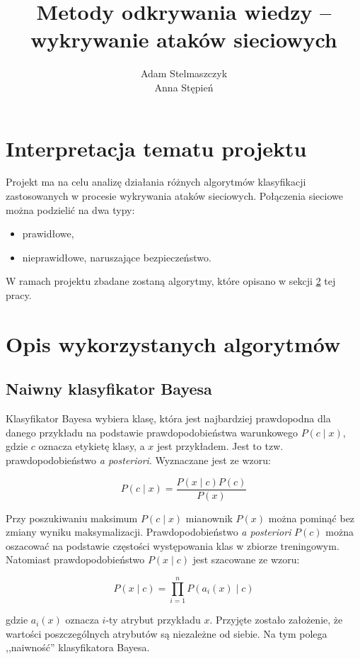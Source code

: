 \documentclass[a4paper, 12pt]{article}
\title{Metody odkrywania wiedzy -- wykrywanie ataków sieciowych}
\author{Adam Stelmaszczyk\\ Anna Stępień}
\begin{document}
\maketitle

\tableofcontents

\newpage

\section{Interpretacja tematu projektu}
Projekt ma na celu analizę działania różnych algorytmów klasyfikacji zastosowanych
w procesie wykrywania ataków sieciowych. Połączenia sieciowe można podzielić na dwa typy:
\begin{itemize}
	\item prawidłowe,
	\item nieprawidłowe, naruszające bezpieczeństwo.
\end{itemize}
W ramach projektu zbadane zostaną algorytmy, które opisano w sekcji \ref{algorithms} 
tej pracy.

\section{Opis wykorzystanych algorytmów}\label{algorithms}

\subsection{Naiwny klasyfikator Bayesa}

Klasyfikator Bayesa wybiera klasę, która jest najbardziej prawdopodna dla danego przykładu na podstawie prawdopodobieństwa
warunkowego $P(c \mid x)$, gdzie $c$ oznacza etykietę klasy, a $x$ jest przykładem. Jest to tzw. prawdopodobieństwo
\textit{a posteriori}. Wyznaczane jest ze wzoru:

$$ P(c \mid x) = \frac{P(x \mid c)P(c)}{P(x)} $$

Przy poszukiwaniu maksimum $P(c \mid x)$ mianownik $P(x)$ można pominąć bez zmiany wyniku maksymalizacji.
Prawdopodobieństwo \textit{a posteriori} $P(c)$ można oszacować na podstawie częstości występowania klas w zbiorze treningowym.
Natomiast prawdopodobieństwo $P(x \mid c)$ jest szacowane ze wzoru:

$$ P(x \mid c) = \prod_{i=1}^n P(a_i(x) \mid c)$$

gdzie $a_i(x)$ oznacza $i$-ty atrybut przykładu $x$.
Przyjęte zostało założenie, że wartości poszczególnych atrybutów są niezależne od siebie.
Na tym polega ,,naiwność'' klasyfikatora Bayesa.
\end{document}
